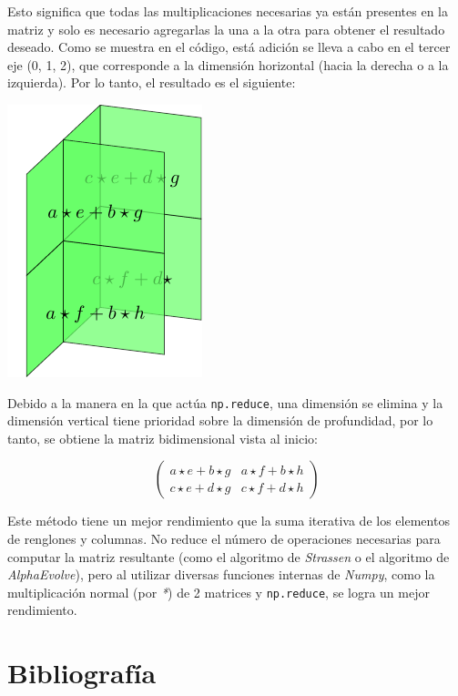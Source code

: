\documentclass{article}
\begin{document}
Esto significa que todas las multiplicaciones necesarias ya están presentes en la matriz y solo es necesario agregarlas la una a la otra para obtener el resultado deseado. Como se muestra en el código, está adición se lleva a cabo en el tercer eje (0, 1, 2), que corresponde a la dimensión horizontal (hacia la derecha o a la izquierda). Por lo tanto, el resultado es el siguiente:

\begin{center}
    \includegraphics{6.pdf}
\end{center}

Debido a la manera en la que actúa \texttt{np.reduce}, una dimensión se elimina y la dimensión vertical tiene prioridad sobre la dimensión de profundidad, por lo tanto, se obtiene la matriz bidimensional vista al inicio:

$$
\begin{pmatrix}
    a \star e + b \star g & a \star f + b \star h \\
    c \star e + d \star g & c \star f + d \star h
\end{pmatrix}
$$

Este método tiene un mejor rendimiento que la suma iterativa de los elementos de renglones y columnas. No reduce el número de operaciones necesarias para computar la matriz resultante (como el algoritmo de \textit{Strassen} o el algoritmo de \textit{AlphaEvolve}), pero al utilizar diversas funciones internas de \textit{Numpy}, como la multiplicación normal (por \textit{*}) de 2 matrices y \texttt{np.reduce}, se logra un mejor rendimiento.

\section{Bibliografía}
\end{document}
